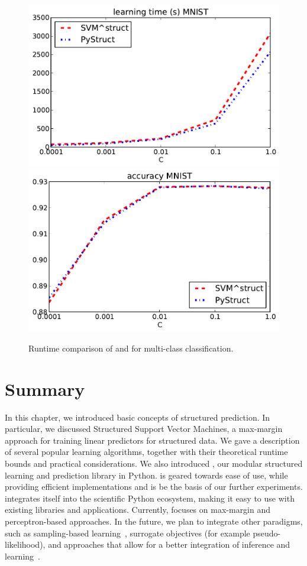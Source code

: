 \begin{figure}
\centering
\includegraphics[width=.49\textwidth]{times_MNIST}
\includegraphics[width=.49\textwidth]{accs_MNIST}
\caption{Runtime comparison of \pystruct and \svmstruct for multi-class
    classification.
}
\label{fig:timings}
\end{figure}


\section{Summary}
In this chapter, we introduced basic concepts of structured prediction. In particular, we discussed
Structured Support Vector Machines, a max-margin approach for training linear predictors for
structured data. %
We gave a description of several popular learning algorithms, together with their theoretical
runtime bounds and practical considerations.
We also introduced \pystruct, our modular structured learning and prediction library in Python.
\pystruct is geared towards ease of use, while providing efficient implementations and is be the
basis of our further experiments.
\pystruct integrates itself into the scientific Python ecosystem, making it easy to use with
existing libraries and applications.
Currently, \pystruct focuses on max-margin and perceptron-based approaches.
In the future, we plan to integrate other paradigms, such as sampling-based
learning~\citep{wick2011samplerank}, surrogate objectives (for example
pseudo-likelihood), and approaches that allow for a better integration of
inference and learning~\citep{meshi2010learning}.
